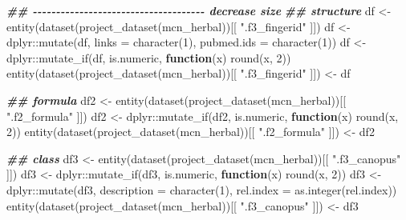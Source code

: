 \documentclass[
]{article}
\newenvironment{Shaded}{\begin{snugshade}}{\end{snugshade}}
\newcommand{\AttributeTok}[1]{\textcolor[rgb]{0.77,0.63,0.00}{#1}}
\newcommand{\ControlFlowTok}[1]{\textcolor[rgb]{0.13,0.29,0.53}{\textbf{#1}}}
\newcommand{\DecValTok}[1]{\textcolor[rgb]{0.00,0.00,0.81}{#1}}
\newcommand{\DocumentationTok}[1]{\textcolor[rgb]{0.56,0.35,0.01}{\textbf{\textit{#1}}}}
\newcommand{\FunctionTok}[1]{\textcolor[rgb]{0.00,0.00,0.00}{#1}}
\newcommand{\NormalTok}[1]{#1}
\newcommand{\OtherTok}[1]{\textcolor[rgb]{0.56,0.35,0.01}{#1}}
\newcommand{\SpecialCharTok}[1]{\textcolor[rgb]{0.00,0.00,0.00}{#1}}
\newcommand{\StringTok}[1]{\textcolor[rgb]{0.31,0.60,0.02}{#1}}
\begin{document}
\begin{Shaded}
\begin{Highlighting}[]
\DocumentationTok{\#\# {-}{-}{-}{-}{-}{-}{-}{-}{-}{-}{-}{-}{-}{-}{-}{-}{-}{-}{-}{-}{-}{-}{-}{-}{-}{-}{-}{-}{-}{-}{-}{-}{-}{-}{-}{-}{-} decrease size}
\DocumentationTok{\#\# structure}
\NormalTok{df }\OtherTok{\textless{}{-}} \FunctionTok{entity}\NormalTok{(}\FunctionTok{dataset}\NormalTok{(}\FunctionTok{project\_dataset}\NormalTok{(mcn\_herbal))[[ }\StringTok{".f3\_fingerid"}\NormalTok{ ]])}
\NormalTok{df }\OtherTok{\textless{}{-}}\NormalTok{ dplyr}\SpecialCharTok{::}\FunctionTok{mutate}\NormalTok{(df, }\AttributeTok{links =} \FunctionTok{character}\NormalTok{(}\DecValTok{1}\NormalTok{), }\AttributeTok{pubmed.ids =} \FunctionTok{character}\NormalTok{(}\DecValTok{1}\NormalTok{))}
\NormalTok{df }\OtherTok{\textless{}{-}}\NormalTok{ dplyr}\SpecialCharTok{::}\FunctionTok{mutate\_if}\NormalTok{(df, is.numeric, }\ControlFlowTok{function}\NormalTok{(x) }\FunctionTok{round}\NormalTok{(x, }\DecValTok{2}\NormalTok{))}
\FunctionTok{entity}\NormalTok{(}\FunctionTok{dataset}\NormalTok{(}\FunctionTok{project\_dataset}\NormalTok{(mcn\_herbal))[[ }\StringTok{".f3\_fingerid"}\NormalTok{ ]]) }\OtherTok{\textless{}{-}}\NormalTok{ df}

\DocumentationTok{\#\# formula}
\NormalTok{df2 }\OtherTok{\textless{}{-}} \FunctionTok{entity}\NormalTok{(}\FunctionTok{dataset}\NormalTok{(}\FunctionTok{project\_dataset}\NormalTok{(mcn\_herbal))[[ }\StringTok{".f2\_formula"}\NormalTok{ ]])}
\NormalTok{df2 }\OtherTok{\textless{}{-}}\NormalTok{ dplyr}\SpecialCharTok{::}\FunctionTok{mutate\_if}\NormalTok{(df2, is.numeric, }\ControlFlowTok{function}\NormalTok{(x) }\FunctionTok{round}\NormalTok{(x, }\DecValTok{2}\NormalTok{))}
\FunctionTok{entity}\NormalTok{(}\FunctionTok{dataset}\NormalTok{(}\FunctionTok{project\_dataset}\NormalTok{(mcn\_herbal))[[ }\StringTok{".f2\_formula"}\NormalTok{ ]]) }\OtherTok{\textless{}{-}}\NormalTok{ df2}

\DocumentationTok{\#\# class}
\NormalTok{df3 }\OtherTok{\textless{}{-}} \FunctionTok{entity}\NormalTok{(}\FunctionTok{dataset}\NormalTok{(}\FunctionTok{project\_dataset}\NormalTok{(mcn\_herbal))[[ }\StringTok{".f3\_canopus"}\NormalTok{ ]])}
\NormalTok{df3 }\OtherTok{\textless{}{-}}\NormalTok{ dplyr}\SpecialCharTok{::}\FunctionTok{mutate\_if}\NormalTok{(df3, is.numeric, }\ControlFlowTok{function}\NormalTok{(x) }\FunctionTok{round}\NormalTok{(x, }\DecValTok{2}\NormalTok{))}
\NormalTok{df3 }\OtherTok{\textless{}{-}}\NormalTok{ dplyr}\SpecialCharTok{::}\FunctionTok{mutate}\NormalTok{(df3, }\AttributeTok{description =} \FunctionTok{character}\NormalTok{(}\DecValTok{1}\NormalTok{),}
                     \AttributeTok{rel.index =} \FunctionTok{as.integer}\NormalTok{(rel.index))}
\FunctionTok{entity}\NormalTok{(}\FunctionTok{dataset}\NormalTok{(}\FunctionTok{project\_dataset}\NormalTok{(mcn\_herbal))[[ }\StringTok{".f3\_canopus"}\NormalTok{ ]]) }\OtherTok{\textless{}{-}}\NormalTok{ df3}


\end{Highlighting}
\end{Shaded}
\end{document}
